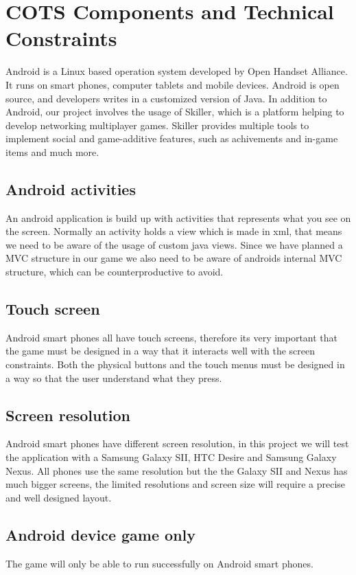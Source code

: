 \section{COTS Components and Technical Constraints}
Android \cite{Android} is a Linux based operation system developed by Open Handset Alliance. It runs on smart phones, computer tablets and mobile devices. Android is open source, and developers writes in a customized version of Java\cite{sdk}. In addition to Android, our project involves the usage of Skiller\cite{Skiller}, which is a platform helping to develop networking multiplayer games. Skiller provides multiple tools to implement social and game-additive features, such as achivements and in-game items and much more.

\subsection{Android activities}
An android application is build up with activities that represents what you see on the screen. Normally an activity holds a view which is made in xml, that means we need to be aware of the usage of custom java views. Since we have planned a MVC structure in our game we also need to be aware of androids internal MVC structure, which can be counterproductive to avoid.

\subsection{Touch screen}
Android smart phones all have touch screens, therefore its very important that the game must be designed in a way that it interacts well with the screen constraints. Both the physical buttons and the touch menus must be designed in a way so that the user understand what they press.

\subsection{Screen resolution}
Android smart phones have different screen resolution, in this project we will test the application with a Samsung Galaxy SII, HTC Desire and Samsung Galaxy Nexus. All phones use the same resolution but the the Galaxy SII and Nexus has much bigger screens, the limited resolutions and screen size will require a precise and well designed layout.

\subsection{Android device game only}
The game will only be able to run successfully on Android smart phones.


